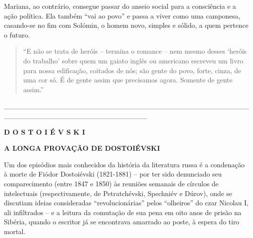 Mariana, ao contrário, consegue passar do anseio social para a
consciência e a ação política. Ela também ``vai ao povo'' e passa a
viver como uma camponesa, casando-se no fim com Solómin, o homem novo,
simples e sólido, a quem pertence o futuro.

\begin{quote}
``E não se trata de heróis -- termina o romance -- nem mesmo desses
`heróis do trabalho' sobre quem um gaiato inglês ou americano escreveu
um livro para nossa edificação, coitados de nós; são gente do povo,
forte, cinza, de uma cor só. É de gente assim que precisamos agora.
Somente de gente assim.''
\end{quote}

\_\_\_\_\_\_\_\_\_\_\_\_\_\_\_\_\_\_\_\_\_\_\_\_\_\_\_\_\_\_\_\_\_\_\_\_\_\_\_\_\_\_\_\_\_\_\_\_\_\_\_\_\_\_\_\_\_\_\_\_\_\_\_\_\_\_\_\_\_\_\_\_\_\_\_\_

\textbf{D O S T O I É V S K I}

\textbf{A LONGA PROVAÇÃO DE DOSTOIÉVSKI}

Um dos episódios mais conhecidos da história da literatura russa é a
condenação à morte de Fiódor Dostoiévski (1821-1881) -- por ter sido
denunciado seu comparecimento (entre 1847 e 1850) às reuniões semanais
de círculos de intelectuais (respectivamente, de Petratchévski,
Spechniév e Dúrov), onde se discutiam ideias consideradas
``revolucionárias'' pelos ``olheiros'' do czar Nicolau I, ali
infiltrados -- e a leitura da comutação de sua pena em oito anos de
prisão na Sibéria, quando o escritor já se encontrava amarrado ao poste,
à espera do tiro mortal.

